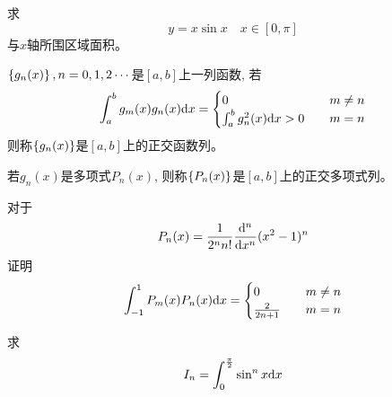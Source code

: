 \begin{example}
    求
    \begin{equation*}
        y = x\sin x \quad x \in [0, \pi]
    \end{equation*}
    与$x$轴所围区域面积。
\end{example}
\begin{solution}
    
\end{solution}

\begin{definition}
    $\left\{ g_n(x)\right\}, n = 0, 1, 2 \cdots$是$[a, b]$上一列函数, 若
    \begin{equation*}
        \int_a^b g_m(x) g_n(x) \mathrm{d} x = \begin{cases}
            0 &\quad m \neq n \\
            \int_a^b g_n^2(x) \mathrm{d} x > 0 &\quad m = n 
        \end{cases}
    \end{equation*}
    则称$\left\{ g_n(x)\right\}$是$[a, b]$上的正交函数列。

    若$g_n(x)$是多项式$P_n(x)$, 则称$\left\{ P_n(x)\right\}$是$[a, b]$上的正交多项式列。
\end{definition}

\begin{example}[Lagandre多项式]
    对于
    \begin{equation*}
        P_n(x) = \frac{1}{2^n n!}\frac{\mathrm{d}^n}{\mathrm{d} x^n}(x^2-1)^n
    \end{equation*}
    证明
    \begin{equation*}
        \int_{-1}^1 P_m(x)P_n(x) \mathrm{d} x = \begin{cases}
            0 &\quad m \neq n \\
            \frac{2}{2n+1} &\quad m = n
        \end{cases}
    \end{equation*}
\end{example}
\begin{solution}
    
\end{solution}

\begin{example}
    求
    \begin{equation*}
        I_n = \int_0^{\frac{\pi}{2}} \sin^n x \mathrm{d} x
    \end{equation*}
\end{example}
\begin{solution}
    
\end{solution}